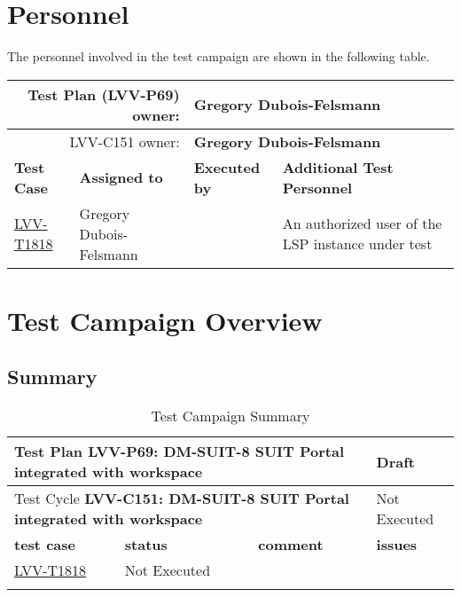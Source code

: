 \documentclass[DM,lsstdraft,STR,toc]{lsstdoc}
\begin{document}
\newpage
\section{Personnel}
\label{sect:personnel}

The personnel involved in the test campaign are shown in the following table.

\begin{longtable}{p{3cm}p{3cm}p{3cm}p{6cm}}
\hline
\multicolumn{2}{r}{Test Plan (LVV-P69) owner:} &
\multicolumn{2}{l}{\textbf{ Gregory Dubois-Felsmann } }\\\hline
\multicolumn{2}{r}{ LVV-C151 owner:} &
\multicolumn{2}{l}{\textbf{
    Gregory Dubois-Felsmann
}
} \\\hline
\textbf{Test Case} & \textbf{Assigned to} & \textbf{Executed by} & \textbf{Additional Test Personnel} \\ \hline
\href{https://jira.lsstcorp.org/secure/Tests.jspa#/testCase/LVV-T1818}{LVV-T1818}
& {\small Gregory Dubois-Felsmann } & {\small  } &
\begin{minipage}[]{6cm}
\smallskip
{\small An authorized user of the LSP instance under test }
\medskip
\end{minipage}
\\ \hline
\end{longtable}

\newpage

\section{Test Campaign Overview}
\label{sect:overview}

\subsection{Summary}
\label{sect:summarytable}

\begin{longtable}{p{2cm}p{2.5cm}p{9cm}p{2.5cm}}
\toprule
\multicolumn{3}{p{13.5cm}}{ Test Plan {\bf LVV-P69: DM-SUIT-8 SUIT Portal integrated with workspace }} & Draft \\\hline

  \multicolumn{3}{p{13.5cm}}{ Test Cycle {\bf LVV-C151: DM-SUIT-8 SUIT Portal integrated with workspace }} & Not Executed \\\hline

  {\bf \footnotesize test case} & {\bf \footnotesize status} & {\bf \footnotesize comment} & {\bf \footnotesize issues} \\\toprule

\href{https://jira.lsstcorp.org/secure/Tests.jspa#/testCase/LVV-T1818}{LVV-T1818}
    & Not Executed &
    \begin{minipage}[]{9cm}
    \smallskip
    
    \medskip
    \end{minipage}
    &
    \\\hline
\caption{Test Campaign Summary}
\label{table:summary}
\end{longtable}
\end{document}
